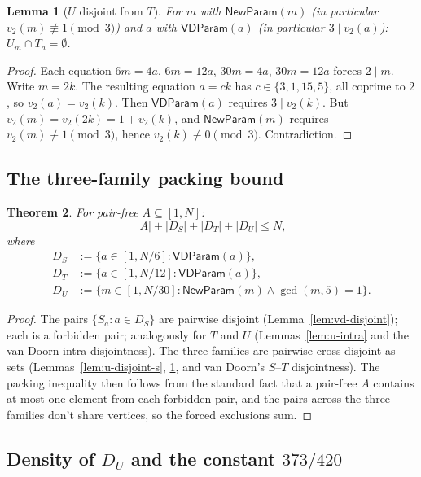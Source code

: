 \documentclass[11pt]{amsart}
\theoremstyle{plain}
\newtheorem{theorem}{Theorem}[section]
\newtheorem{lemma}[theorem]{Lemma}
\theoremstyle{definition}
\newcommand{\vdp}{\mathsf{VDParam}}
\newcommand{\np}{\mathsf{NewParam}}
\begin{document}
\begin{lemma}[$U$ disjoint from $T$]\label{lem:u-disjoint-t}
For $m$ with $\np(m)$ (in particular $v_2(m) \not\equiv 1 \pmod 3$) and $a$ with $\vdp(a)$ (in particular $3 \mid v_2(a)$): $U_m \cap T_a = \emptyset$.
\end{lemma}

\begin{proof}
Each equation $6m = 4a$, $6m = 12a$, $30m = 4a$, $30m = 12a$ forces $2 \mid m$. Write $m = 2k$. The resulting equation $a = c k$ has $c \in \{3, 1, 15, 5\}$, all coprime to $2$, so $v_2(a) = v_2(k)$. Then $\vdp(a)$ requires $3 \mid v_2(k)$. But $v_2(m) = v_2(2k) = 1 + v_2(k)$, and $\np(m)$ requires $v_2(m) \not\equiv 1 \pmod 3$, hence $v_2(k) \not\equiv 0 \pmod 3$. Contradiction.
\end{proof}

\subsection{The three-family packing bound}

\begin{theorem}\label{thm:three-family-packing}
For pair-free $A \subseteq [1, N]$:
\[
  |A| + |D_S| + |D_T| + |D_U| \leq N,
\]
where
\begin{align*}
  D_S &:= \{a \in [1, N/6] : \vdp(a)\}, \\
  D_T &:= \{a \in [1, N/12] : \vdp(a)\}, \\
  D_U &:= \{m \in [1, N/30] : \np(m) \wedge \gcd(m, 5) = 1\}.
\end{align*}
\end{theorem}

\begin{proof}
The pairs $\{S_a : a \in D_S\}$ are pairwise disjoint (Lemma~\ref{lem:vd-disjoint}); each is a forbidden pair; analogously for $T$ and $U$ (Lemmas~\ref{lem:u-intra} and the van Doorn intra-disjointness). The three families are pairwise cross-disjoint as sets (Lemmas~\ref{lem:u-disjoint-s}, \ref{lem:u-disjoint-t}, and van Doorn's $S$--$T$ disjointness). The packing inequality then follows from the standard fact that a pair-free $A$ contains at most one element from each forbidden pair, and the pairs across the three families don't share vertices, so the forced exclusions sum.
\end{proof}

\subsection{Density of $D_U$ and the constant $373/420$}
\end{document}
